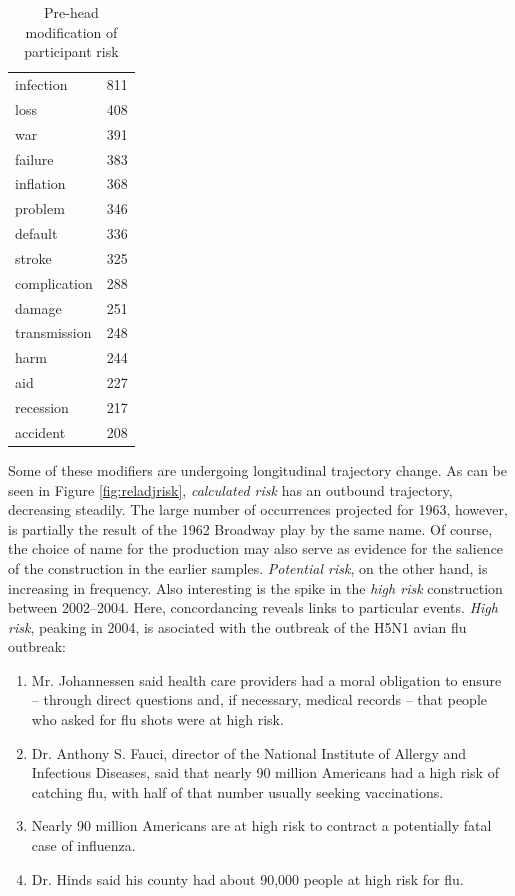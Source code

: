 \begin{table}
{\begin{minipage}{0.35\textwidth}
\begin{tabular}{ll}
infection          & 811   \\ 
loss               & 408   \\ 
war                & 391   \\ 
failure            & 383   \\ 
inflation          & 368   \\ 
problem            & 346   \\ 
default            & 336   \\ 
stroke             & 325   \\ 
complication       & 288   \\ 
damage             & 251   \\ 
transmission       & 248   \\ 
harm               & 244   \\ 
aid                & 227   \\ 
recession          & 217   \\ 
accident           & 208   \\ \bottomrule
\end{tabular}
\caption{Pre-head modification of participant risk}
\label{tab:posthead}
\end{minipage}}
\end{table}

Some of these modifiers are undergoing longitudinal trajectory change. As can be seen in Figure \ref{fig:reladjrisk}, \emph{calculated risk} has an outbound trajectory, decreasing steadily. The large number of occurrences projected for 1963, however, is partially the result of the 1962 Broadway play by the same name. Of course, the choice of name for the production may also serve as evidence for the salience of the construction in the earlier samples.  \emph{Potential risk}, on the other hand, is increasing in frequency. Also interesting is the spike in the \emph{high risk} construction between 2002--2004. Here, concordancing reveals links to particular events. \emph{High risk}, peaking in 2004, is asociated with the outbreak of the H5N1 avian flu outbreak: 


\begin{enumerate}   [before=\color{black}\ttfamily] \setlength\itemsep{0em} \small
\item Mr. Johannessen said health care providers had a moral obligation to ensure -- through direct questions and, if necessary, medical records -- that people who asked for flu shots were at high risk. 
\item Dr. Anthony S. Fauci, director of the National Institute of Allergy and Infectious Diseases, said that nearly 90 million Americans had a high risk of catching flu, with half of that number usually seeking vaccinations. 
\item Nearly 90 million Americans are at high risk to contract a potentially fatal case of influenza. 
\item Dr. Hinds said his county had about 90,000 people at high risk for flu. 
\end{enumerate}
%

